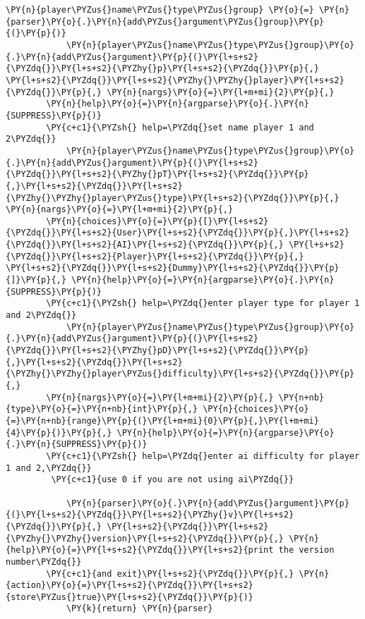 \begin{Verbatim}[commandchars=\\\{\}]
            \PY{n}{player\PYZus{}name\PYZus{}type\PYZus{}group} \PY{o}{=} \PY{n}{parser}\PY{o}{.}\PY{n}{add\PYZus{}argument\PYZus{}group}\PY{p}{(}\PY{p}{)}
            \PY{n}{player\PYZus{}name\PYZus{}type\PYZus{}group}\PY{o}{.}\PY{n}{add\PYZus{}argument}\PY{p}{(}\PY{l+s+s2}{\PYZdq{}}\PY{l+s+s2}{\PYZhy{}p}\PY{l+s+s2}{\PYZdq{}}\PY{p}{,} \PY{l+s+s2}{\PYZdq{}}\PY{l+s+s2}{\PYZhy{}\PYZhy{}player}\PY{l+s+s2}{\PYZdq{}}\PY{p}{,} \PY{n}{nargs}\PY{o}{=}\PY{l+m+mi}{2}\PY{p}{,} 
		\PY{n}{help}\PY{o}{=}\PY{n}{argparse}\PY{o}{.}\PY{n}{SUPPRESS}\PY{p}{)} 
		\PY{c+c1}{\PYZsh{} help=\PYZdq{}set name player 1 and 2\PYZdq{}}
            \PY{n}{player\PYZus{}name\PYZus{}type\PYZus{}group}\PY{o}{.}\PY{n}{add\PYZus{}argument}\PY{p}{(}\PY{l+s+s2}{\PYZdq{}}\PY{l+s+s2}{\PYZhy{}pT}\PY{l+s+s2}{\PYZdq{}}\PY{p}{,}\PY{l+s+s2}{\PYZdq{}}\PY{l+s+s2}{\PYZhy{}\PYZhy{}player\PYZus{}type}\PY{l+s+s2}{\PYZdq{}}\PY{p}{,} \PY{n}{nargs}\PY{o}{=}\PY{l+m+mi}{2}\PY{p}{,} 
		\PY{n}{choices}\PY{o}{=}\PY{p}{[}\PY{l+s+s2}{\PYZdq{}}\PY{l+s+s2}{User}\PY{l+s+s2}{\PYZdq{}}\PY{p}{,}\PY{l+s+s2}{\PYZdq{}}\PY{l+s+s2}{AI}\PY{l+s+s2}{\PYZdq{}}\PY{p}{,} \PY{l+s+s2}{\PYZdq{}}\PY{l+s+s2}{Player}\PY{l+s+s2}{\PYZdq{}}\PY{p}{,} \PY{l+s+s2}{\PYZdq{}}\PY{l+s+s2}{Dummy}\PY{l+s+s2}{\PYZdq{}}\PY{p}{]}\PY{p}{,} \PY{n}{help}\PY{o}{=}\PY{n}{argparse}\PY{o}{.}\PY{n}{SUPPRESS}\PY{p}{)} 
		\PY{c+c1}{\PYZsh{} help=\PYZdq{}enter player type for player 1 and 2\PYZdq{}}
            \PY{n}{player\PYZus{}name\PYZus{}type\PYZus{}group}\PY{o}{.}\PY{n}{add\PYZus{}argument}\PY{p}{(}\PY{l+s+s2}{\PYZdq{}}\PY{l+s+s2}{\PYZhy{}pD}\PY{l+s+s2}{\PYZdq{}}\PY{p}{,}\PY{l+s+s2}{\PYZdq{}}\PY{l+s+s2}{\PYZhy{}\PYZhy{}player\PYZus{}difficulty}\PY{l+s+s2}{\PYZdq{}}\PY{p}{,} 
		\PY{n}{nargs}\PY{o}{=}\PY{l+m+mi}{2}\PY{p}{,} \PY{n+nb}{type}\PY{o}{=}\PY{n+nb}{int}\PY{p}{,} \PY{n}{choices}\PY{o}{=}\PY{n+nb}{range}\PY{p}{(}\PY{l+m+mi}{0}\PY{p}{,}\PY{l+m+mi}{4}\PY{p}{)}\PY{p}{,} \PY{n}{help}\PY{o}{=}\PY{n}{argparse}\PY{o}{.}\PY{n}{SUPPRESS}\PY{p}{)} 
		\PY{c+c1}{\PYZsh{} help=\PYZdq{}enter ai difficulty for player 1 and 2,\PYZdq{}}
 		 \PY{c+c1}{use 0 if you are not using ai\PYZdq{}}
        
            \PY{n}{parser}\PY{o}{.}\PY{n}{add\PYZus{}argument}\PY{p}{(}\PY{l+s+s2}{\PYZdq{}}\PY{l+s+s2}{\PYZhy{}v}\PY{l+s+s2}{\PYZdq{}}\PY{p}{,} \PY{l+s+s2}{\PYZdq{}}\PY{l+s+s2}{\PYZhy{}\PYZhy{}version}\PY{l+s+s2}{\PYZdq{}}\PY{p}{,} \PY{n}{help}\PY{o}{=}\PY{l+s+s2}{\PYZdq{}}\PY{l+s+s2}{print the version number\PYZdq{}}
		\PY{c+c1}{and exit}\PY{l+s+s2}{\PYZdq{}}\PY{p}{,} \PY{n}{action}\PY{o}{=}\PY{l+s+s2}{\PYZdq{}}\PY{l+s+s2}{store\PYZus{}true}\PY{l+s+s2}{\PYZdq{}}\PY{p}{)}
            \PY{k}{return} \PY{n}{parser}
\end{Verbatim}


